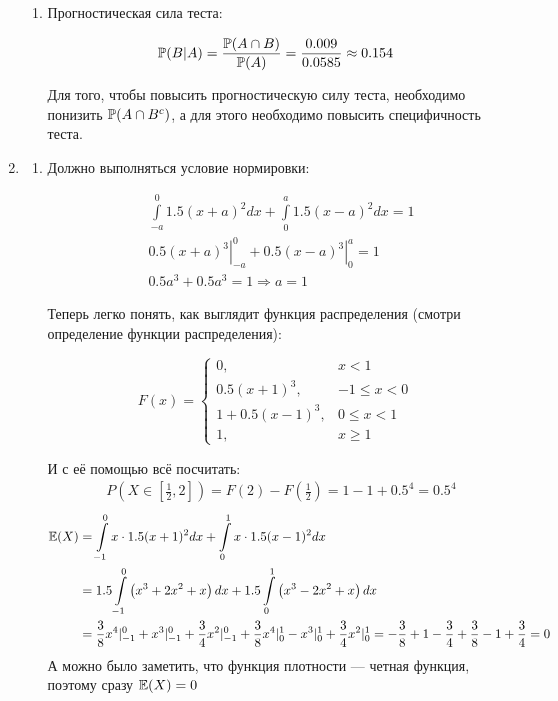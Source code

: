 \begin{enumerate}
\begin{enumerate}
\item Прогностическая сила теста:

\[
\P(B | A) = \frac{\P(A \cap B)}{\P(A) } = \frac{0.009}{0.0585} \approx 0.154
\]

Для того, чтобы повысить прогностическую силу теста, необходимо понизить
$\P(A \cap B^c) $, а для этого необходимо повысить специфичность теста.
\end{enumerate}

\item
\begin{enumerate}
\item
Должно выполняться условие нормировки:

\begin{align*}
& \int \limits_{-a}^0 1.5(x+a)^2 dx + \int \limits_0^a 1.5(x- a)^2  dx = 1   \\
& \left. 0.5(x+a)^3 \right|_{-a}^0 + \left. 0.5(x- a)^3 \right|_0^a  = 1  \\
& 0.5a^3 + 0.5a^3 = 1 \Rightarrow a = 1
\end{align*}

Теперь легко понять, как выглядит функция распределения (смотри определение функции распределения):

\[
F(x) = \begin{cases}
0, & x < 1 \\
0.5 (x+1)^3, & -1 \leqslant x <0 \\
1 + 0.5 (x-1)^3, & 0 \leqslant x < 1 \\
1, & x \geqslant 1
\end{cases}
\]

И с её помощью всё посчитать:
\begin{align*}
& P\left(X \in \left[\frac{1}{2}, 2 \right]  \right) = F(2) - F\left(\frac{1}{2} \right) =
1 - 1 +0.5^4 = 0.5^4
\end{align*}
\begin{align*}
\E(X) &= \int \limits_{-1}^0 x \cdot 1.5 (x + 1)^2 dx +  \int \limits_0^1 x \cdot 1.5 (x - 1)^2 dx \\
& = 1.5 \int \limits_{-1}^0\left( x^3 + 2x^2 + x\right) dx + 1.5 \int \limits_0^1\left( x^3 -2x^2 + x\right) dx \\
& =  \frac{3}{8} x^4 |_{-1}^0 + x^3 |_{-1}^0 + \frac{3}{4} x^2|_{-1}^0+    \frac{3}{8} x^4 |_0^1   - x^3 |_0^1 + \frac{3}{4} x^2|_0^1  = - \frac{3}{8}  + 1- \frac{3}{4} + \frac{3}{8} - 1 +\frac{3}{4} = 0
\end{align*}
А можно было заметить, что функция плотности — четная функция, поэтому сразу $\E(X) = 0$


\end{enumerate}
\end{enumerate}
